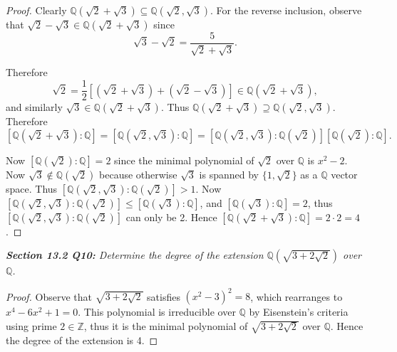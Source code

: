 \documentclass{article}
\begin{document}
  \begin{proof}
    Clearly $\mathbb{Q}(\sqrt{2}+\sqrt{3})
    \subseteq\mathbb{Q}(\sqrt{2},\sqrt{3})$. For the reverse inclusion,
    observe that $\sqrt{2}-\sqrt{3} \in\mathbb{Q}(\sqrt{2}+\sqrt{3})$ since
    \[\sqrt{3}-\sqrt{2} =\frac{5}{\sqrt{2}+\sqrt{3}}.\]

    Therefore
    \[\sqrt{2} =\frac{1}{2} [(\sqrt{2}+\sqrt{3}) +(\sqrt{2}-\sqrt{3})]
    \in\mathbb{Q}(\sqrt{2}+\sqrt{3}),\]
    and similarly $\sqrt{3} \in\mathbb{Q}(\sqrt{2}+\sqrt{3})$. Thus
    $\mathbb{Q}(\sqrt{2}+\sqrt{3}) \supseteq\mathbb{Q}(\sqrt{2},\sqrt{3})$.
    \\

    Therefore
    \[[\mathbb{Q}(\sqrt{2}+\sqrt{3}):\mathbb{Q}]
    =[\mathbb{Q}(\sqrt{2},\sqrt{3}):\mathbb{Q}]
    =[\mathbb{Q}(\sqrt{2},\sqrt{3}):\mathbb{Q}(\sqrt{2})]
    [\mathbb{Q}(\sqrt{2}):\mathbb{Q}].\]

    Now $[\mathbb{Q}(\sqrt{2}):\mathbb{Q}]=2$ since the minimal polynomial
    of $\sqrt{2}$ over $\mathbb{Q}$ is $x^2-2$. Now
    $\sqrt{3}\not\in\mathbb{Q}(\sqrt{2})$ because otherwise $\sqrt{3}$ is
    spanned by $\{1,\sqrt{2}\}$ as a $\mathbb{Q}$ vector space. Thus
    $[\mathbb{Q}(\sqrt{2},\sqrt{3}):\mathbb{Q}(\sqrt{2})] >1$. Now
    $[\mathbb{Q}(\sqrt{2},\sqrt{3}):\mathbb{Q}(\sqrt{2})]
    \leq[\mathbb{Q}(\sqrt{3}):\mathbb{Q}]$, and
    $[\mathbb{Q}(\sqrt{3}):\mathbb{Q}]=2$, thus
    $[\mathbb{Q}(\sqrt{2},\sqrt{3}):\mathbb{Q}(\sqrt{2})]$ can only be 2.
    Hence $[\mathbb{Q}(\sqrt{2}+\sqrt{3}):\mathbb{Q}]=2\cdot2=4$.
  \end{proof}

\it \textbf{Section 13.2 Q10:} Determine the degree of the extension
  $\mathbb{Q}(\sqrt{3+2\sqrt{2}})$ over $\mathbb{Q}$.

  \begin{proof}
    Observe that $\sqrt{3+2\sqrt{2}}$ satisfies $(x^2-3)^2=8$, which
    rearranges to $x^4-6x^2+1=0$. This polynomial is irreducible over
    $\mathbb{Q}$ by Eisenstein's criteria using prime $2\in\mathbb{Z}$,
    thus it is the minimal polynomial of $\sqrt{3+2\sqrt{2}}$ over
    $\mathbb{Q}$. Hence the degree of the extension is 4.
  \end{proof}
\end{document}
